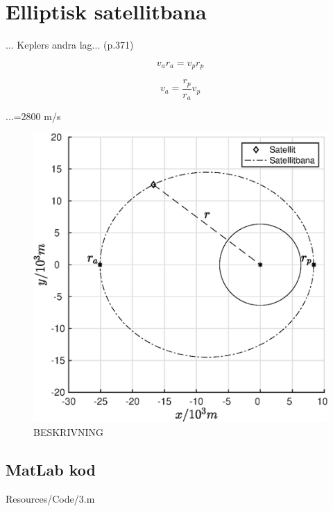 \section*{\centering Elliptisk satellitbana}


... Keplers andra lag... (p.371)

\begin{equation}
    v_a r_a = v_p r_p
\end{equation}

\begin{equation} \label{eq:v_min}
    v_a = \dfrac{r_p}{r_a}v_{p}
\end{equation}

...=2800 m/s 

\begin{figure}[H]
    \centering
    \captionsetup{justification=centering,margin=2cm}
    \includegraphics[scale=0.5]{Resources/Graphics/fig3_1.eps}
    \caption{BESKRIVNING}
    \label{fig:3_1}
\end{figure}

\np
\subsection*{MatLab kod}
 {Resources/Code/3.m}